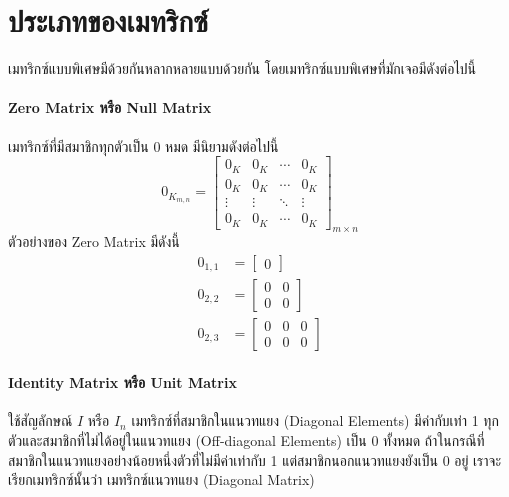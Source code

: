 \section{ประเภทของเมทริกซ์}
\label{sec:matrix_type}

เมทริกซ์แบบพิเศษมีด้วยกันหลากหลายแบบด้วยกัน โดยเมทริกซ์แบบพิเศษที่มักเจอมีดังต่อไปนี้

\paragraph{Zero Matrix หรือ Null Matrix} เมทริกซ์ที่มีสมาชิกทุกตัวเป็น 0 หมด มีนิยามดังต่อไปนี้
%
\begin{equation}
    0_{K_{m,n}} = 
    \begin{bmatrix}
        0_K & 0_K & \cdots & 0_K \\
        0_K & 0_K & \cdots & 0_K \\
        \vdots & \vdots & \ddots  & \vdots \\
        0_K & 0_K & \cdots & 0_K 
    \end{bmatrix}_{m \times n}
\end{equation}
%
ตัวอย่างของ Zero Matrix มีดังนี้
%
\begin{align}
    0_{1,1} &= \begin{bmatrix}
    0 \end{bmatrix}
    \\
    0_{2,2} &= \begin{bmatrix}
    0 & 0 \\
    0 & 0 \end{bmatrix}
    \\
    0_{2,3} &= \begin{bmatrix}
    0 & 0 & 0 \\
    0 & 0 & 0 \end{bmatrix}
\end{align}

\paragraph{Identity Matrix หรือ Unit Matrix} ใช้สัญลักษณ์ $I$ หรือ $I_{n}$ เมทริกซ์ที่สมาชิกในแนวทแยง (Diagonal Elements) มีค่ากับเท่า 1 ทุกตัวและสมาชิกที่ไม่ได้อยู่ในแนวทแยง (Off-diagonal Elements) เป็น 0 ทั้งหมด ถ้าในกรณีที่สมาชิกในแนวทแยงอย่างน้อยหนึ่งตัวที่ไม่มีค่าเท่ากับ 1 แต่สมาชิกนอกแนวทแยงยังเป็น 0 อยู่ เราจะเรียกเมทริกซ์นั้นว่า เมทริกซ์แนวทแยง (Diagonal Matrix)

